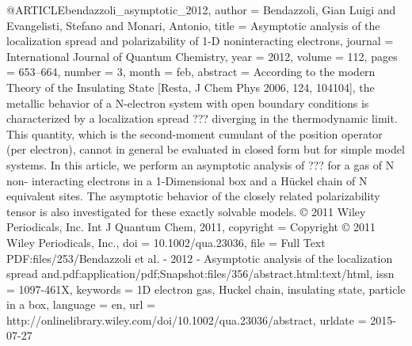 @ARTICLE{bendazzoli_asymptotic_2012,
  author = {Bendazzoli, Gian Luigi and Evangelisti, Stefano and Monari, Antonio},
  title = {Asymptotic analysis of the localization spread and polarizability
	of 1-{D} noninteracting electrons},
  journal = {International Journal of Quantum Chemistry},
  year = {2012},
  volume = {112},
  pages = {653--664},
  number = {3},
  month = feb,
  abstract = {According to the modern Theory of the Insulating State [Resta, J Chem
	Phys 2006, 124, 104104], the metallic behavior of a N-electron system
	with open boundary conditions is characterized by a localization
	spread ??? diverging in the thermodynamic limit. This quantity, which
	is the second-moment cumulant of the position operator (per electron),
	cannot in general be evaluated in closed form but for simple model
	systems. In this article, we perform an asymptotic analysis of ???
	for a gas of N non- interacting electrons in a 1-Dimensional box
	and a Hückel chain of N equivalent sites. The asymptotic behavior
	of the closely related polarizability tensor is also investigated
	for these exactly solvable models. © 2011 Wiley Periodicals, Inc.
	Int J Quantum Chem, 2011},
  copyright = {Copyright © 2011 Wiley Periodicals, Inc.},
  doi = {10.1002/qua.23036},
  file = {Full Text PDF:files/253/Bendazzoli et al. - 2012 - Asymptotic analysis of the localization       spread and.pdf:application/pdf;Snapshot:files/356/abstract.html:text/html},
  issn = {1097-461X},
  keywords = {1D electron gas, Huckel chain, insulating state, particle in a box},
  language = {en},
  url = {http://onlinelibrary.wiley.com/doi/10.1002/qua.23036/abstract},
  urldate = {2015-07-27}
}

